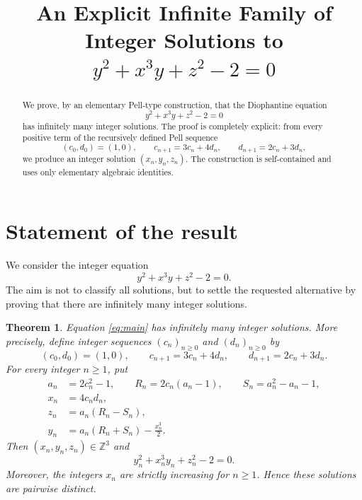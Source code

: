 \documentclass[11pt]{article}
\title{An Explicit Infinite Family of Integer Solutions to \texorpdfstring{\(y^2+x^3y+z^2-2=0\)}{y^2+x^3y+z^2-2=0}}
\author{}
\date{}
\numberwithin{equation}{section}
\newtheorem{theorem}{Theorem}[section]
\theoremstyle{remark}
\begin{document}
\maketitle

\begin{abstract}
We prove, by an elementary Pell-type construction, that the Diophantine equation
\[
    y^2+x^3y+z^2-2=0
\]
has infinitely many integer solutions.  The proof is completely explicit: from every positive term of the recursively defined Pell sequence
\[
    (c_0,d_0)=(1,0),\qquad
    c_{n+1}=3c_n+4d_n,\qquad d_{n+1}=2c_n+3d_n,
\]
we produce an integer solution \((x_n,y_n,z_n)\).  The construction is self-contained and uses only elementary algebraic identities.
\end{abstract}

\section{Statement of the result}

We consider the integer equation
\begin{equation}\label{eq:main}
    y^2+x^3y+z^2-2=0.
\end{equation}
The aim is not to classify all solutions, but to settle the requested alternative by proving that there are infinitely many integer solutions.

\begin{theorem}\label{thm:main}
Equation \eqref{eq:main} has infinitely many integer solutions.  More precisely, define integer sequences \((c_n)_{n\ge 0}\) and \((d_n)_{n\ge 0}\) by
\begin{equation}\label{eq:pell-recurrence}
    (c_0,d_0)=(1,0),\qquad
    c_{n+1}=3c_n+4d_n,
    \qquad
    d_{n+1}=2c_n+3d_n.
\end{equation}
For every integer \(n\ge 1\), put
\begin{equation}\label{eq:definitions}
\begin{aligned}
    a_n&=2c_n^2-1,\qquad
    R_n=2c_n(a_n-1),\qquad
    S_n=a_n^2-a_n-1,\\
    x_n&=4c_nd_n,\\
    z_n&=a_n(R_n-S_n),\\
    y_n&=a_n(R_n+S_n)-\frac{x_n^3}{2}.
\end{aligned}
\end{equation}
Then \((x_n,y_n,z_n)\in\mathbb Z^3\) and
\[
    y_n^2+x_n^3y_n+z_n^2-2=0.
\]
Moreover, the integers \(x_n\) are strictly increasing for \(n\ge 1\).  Hence these solutions are pairwise distinct.
\end{theorem}
\end{document}
